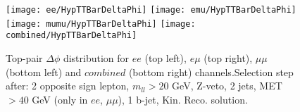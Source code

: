 \clearpage
\newpage

\begin{figure}
  \texttt{[image: ee/HypTTBarDeltaPhi]}
  \texttt{[image: emu/HypTTBarDeltaPhi]}\\
  \texttt{[image: mumu/HypTTBarDeltaPhi]}
  \texttt{[image: combined/HypTTBarDeltaPhi]}
\caption{Top-pair $\Delta \phi$ distribution for $ee$ (top left), $e\mu$ (top right), $\mu\mu$ (bottom left) and $combined$ (bottom right) channels.\newline Selection step after: 2 opposite sign lepton, $m_{ll}>20$ GeV, Z-veto, 2 jets, MET$>40$ GeV (only in $ee$, $\mu\mu$), 1 b-jet, Kin. Reco. solution.}
\end{figure}
